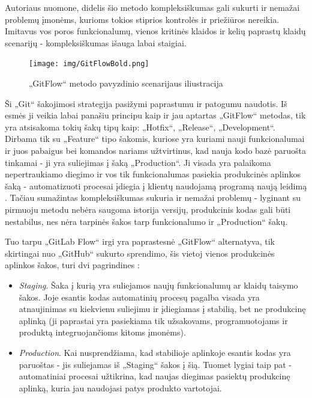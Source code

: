 \documentclass{VUMIFPSkursinis}
\begin{document}
Autoriaus nuomone, didelis šio metodo kompleksiškumas gali sukurti ir nemažai problemų įmonėms, kurioms tokios stiprios kontrolės ir priežiūros nereikia. Imitavus vos poros funkcionalumų, vienos kritinės klaidos ir kelių paprastų klaidų scenarijų - kompleksiškumas išauga labai staigiai.

\begin{figure}[H]
    \centering
    \texttt{[image: img/GitFlowBold.png]}
    \caption{„GitFlow“ metodo pavyzdinio scenarijaus iliustracija}
    \label{img:mlp}
\end{figure}


Ši „Git“ šakojimosi strategija pasižymi paprastumu ir patogumu naudotis. Iš esmės ji veikia labai panašiu principu kaip ir jau aptartas „GitFlow“ metodas, tik yra atsisakoma tokių šakų tipų kaip: „Hotfix“, „Release“, „Development“. Dirbama tik su „Feature“ tipo šakomis, kuriose yra kuriami nauji funkcionalumai ir juos pabaigus bei komandos nariams užtvirtinus, kad nauja kodo bazė paruošta tinkamai - ji yra suliejimas į šaką „Production“. Ji visada yra palaikoma nepertraukiamo diegimo ir vos tik funkcionalumas pasiekia produkcinės aplinkos šaką - automatizuoti procesai įdiegia į klientų naudojamą programą naują leidimą \cite{SaltDevintas}. Tačiau sumažintas kompleksiškumas sukuria ir nemažai problemų - lyginant su pirmuoju metodu nebėra saugoma istorija versijų, produkcinis kodas gali būti nestabilus, nes nėra tarpinės šakos tarp funkcionalumo ir „Production“ šakų.

Tuo tarpu „GitLab Flow“ irgi yra paprastesnė „GitFlow“ alternatyva, tik skirtingai nuo „GitHub“ sukurto sprendimo, šis vietoj vienos produkcinės aplinkos šakos, turi dvi pagrindines \cite{SaltDesimtas}:

\begin{itemize}
  \item \textit{Staging}. Šaka į kurią yra suliejamos naujų funkcionalumų ar klaidų taisymo šakos. Joje esantis kodas automatinių procesų pagalba visada yra atnaujinimas su kiekvienu suliejimu ir įdiegiamas į stabilią, bet ne produkcinę aplinką (ji paprastai yra pasiekiama tik užsakovams, programuotojams ir produktą integruojančioms kitoms įmonėms).
  
  \item \textit{Production}. Kai nusprendžiama, kad stabilioje aplinkoje esantis kodas yra paruoštas - jis suliejamas iš „Staging“ šakos į šią. Tuomet lygiai taip pat - automatiniai procesai užtikrina, kad naujas diegimas pasiektų produkcinę aplinką, kuria jau naudojasi patys produkto vartotojai.

\end{itemize}
\end{document}
